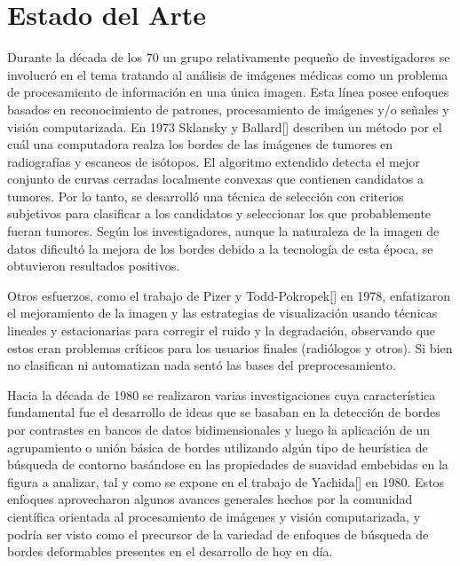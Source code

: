 \chapter{Estado del Arte}\label{chapter:state-of-the-art}

\par Durante la d\'ecada de los 70 un grupo relativamente pequeño de investigadores se involucró en el tema tratando al análisis de imágenes m\'edicas como un problema de procesamiento de información en una única imagen. Esta l\'inea posee enfoques basados en reconocimiento de patrones, procesamiento de imágenes y/o señales y visión computarizada. En 1973 Sklansky y Ballard[\cite{1}] describen un m\'etodo por el cu\'al una computadora realza los bordes de las imágenes de tumores en radiografías y escaneos de isótopos. El algoritmo extendido detecta el mejor conjunto de curvas cerradas localmente convexas que contienen candidatos a tumores. Por lo tanto, se desarrolló una técnica de selección con criterios subjetivos para clasificar a los candidatos y seleccionar los que probablemente fueran tumores. Seg\'un los investigadores, aunque la naturaleza de la imagen de datos dificultó la mejora de los bordes debido a la tecnolog\'ia de esta \'epoca, se obtuvieron resultados positivos.

\par Otros esfuerzos, como el trabajo de Pizer y Todd-Pokropek[\cite{2}] en 1978, enfatizaron el mejoramiento de la imagen y las estrategias de visualización usando t\'ecnicas lineales y estacionarias para corregir el ruido y la degradaci\'on, observando que estos eran problemas críticos para los usuarios finales (radiólogos y otros). Si bien no clasifican ni automatizan nada sentó las bases del preprocesamiento.

\par Hacia la d\'ecada de 1980 se realizaron varias investigaciones cuya caracter\'istica fundamental fue el desarrollo de ideas que se basaban en la detecci\'on de bordes por contrastes en bancos de datos bidimensionales y luego la aplicaci\'on de un agrupamiento o uni\'on b\'asica de bordes utilizando algún tipo de heurística de búsqueda de contorno basándose en las propiedades de suavidad embebidas en la figura a analizar, tal y como se expone en el trabajo de Yachida[\textcolor{cyan}{\cite{3}}] en 1980. Estos enfoques aprovecharon algunos avances generales hechos por la comunidad científica orientada al procesamiento de imágenes y visión computarizada, y podría ser visto como el precursor de la variedad de enfoques de búsqueda de bordes deformables presentes en el desarrollo de hoy en día.

